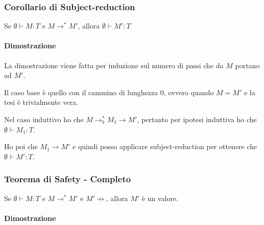 


\subsubsection{Corollario di Subject-reduction}

\begin{center}
	Se $\emptyset \vdash M : T$ e $M \rightarrow^* M'$, allora $\emptyset \vdash M' : T$
\end{center}

\paragraph{Dimostrazione}

La dimostrazione viene fatta per induzione sul numero di passi che da $M$ portano ad $M'$.

Il caso base è quello con il cammino di lunghezza 0, ovvero quando $M = M'$ e la tesi è trivialmente vera.

Nel caso induttivo ho che $M \rightarrow^{*}_k M_1 \rightarrow M'$, pertanto per ipotesi induttiva ho che $\emptyset \vdash M_1 : T$. 

Ho poi che $M_1 \rightarrow M'$ e quindi posso applicare subject-reduction per ottenere che $\emptyset \vdash M' : T$.

\subsubsection{Teorema di Safety - Completo}

\begin{center}
	Se $\emptyset \vdash M : T $ e $M \rightarrow^* M'$ e $M' \not\rightarrow$, allora $M'$ è un valore.
\end{center}

\paragraph{Dimostrazione}

